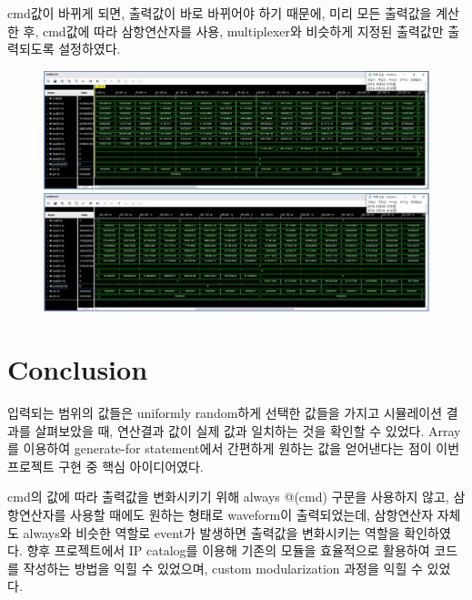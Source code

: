 \documentclass{article}
\begin{document}
cmd값이 바뀌게 되면, 출력값이 바로 바뀌어야 하기 때문에, 미리 모든 출력값을 계산한 후, cmd값에 따라 삼항연산자를 사용, multiplexer와 비슷하게 지정된 출력값만 출력되도록 설정하였다.

\begin{figure}[ht]
	\centering
	\includegraphics[width=1.0\textwidth]{../report/Waveform_Adder-Array/tb_adder_array1.png}
	\includegraphics[width=1.0\textwidth]{../report/Waveform_Adder-Array/tb_adder_array2.png}
\end{figure}
 
\section{Conclusion}

입력되는 범위의 값들은 uniformly random하게 선택한 값들을 가지고 시뮬레이션 결과를 살펴보았을 때,
연산결과 값이 실제 값과 일치하는 것을 확인할 수 있었다.
Array를 이용하여 generate-for statement에서 간편하게 원하는 값을 얻어낸다는 점이 이번 프로젝트 구현 중 핵심 아이디어였다. 

cmd의 값에 따라 출력값을 변화시키기 위해 always @(cmd) 구문을 사용하지 않고, 삼항연산자를 사용할 때에도 원하는 형태로 waveform이 출력되었는데, 삼항연산자 자체도 always와 비슷한 역할로 event가 발생하면 출력값을 변화시키는 역할을 확인하였다.
향후 프로젝트에서 IP catalog를 이용해 기존의 모듈을 효율적으로 활용하여 코드를 작성하는 방법을 익힐 수 있었으며, custom modularization 과정을 익힐 수 있었다.
\newpage


\end{document}

